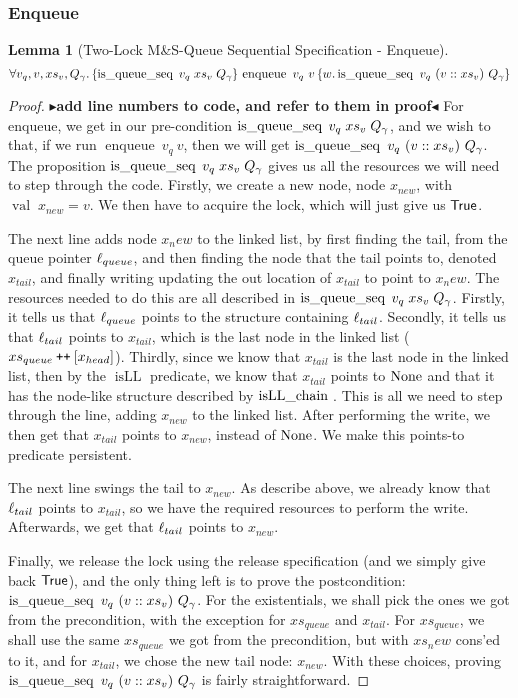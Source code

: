 \documentclass[a4paper, 11pt]{report}
\newtheorem{lemma}[theorem]{Lemma}
\newcommand{\enqueue}{\operatorname{enqueue}}
\newcommand{\isqueueseq}{\operatorname{is\_queue\_seq}}
\newcommand{\isLLchain}[1]{\operatorname{isLL\_chain} \; #1}
\newcommand{\isLL}{\operatorname{isLL}}
\newcommand{\nVal}[1]{\operatorname{val} \; #1}
\newcommand\catenate{\mathbin{\text{\ttfamily\upshape ++}}}
\newcommand{\tlseqspecenq}{\All v_q, v, xs_v, Q_\gname. \hoare{\isqueueseq \; v_q \; xs_v \; Q_\gname}{\enqueue\ v_q\ v}{w . \isqueueseq\ v_q\ (v :: xs_v)\ Q_\gname}}
\newcommand{\todo}[1]{{\color[rgb]{.5,0,0}\textbf{$\blacktriangleright$#1$\blacktriangleleft$}}}
\begin{document}
\subsubsection{Enqueue}
\begin{lemma}[Two-Lock M\&S-Queue Sequential Specification - Enqueue]\label{TLMSQ:spec:seq:enqueue}
  \begin{equation*}
    \tlseqspecenq
  \end{equation*}
\end{lemma}
\begin{proof}
\todo{add line numbers to code, and refer to them in proof}
For enqueue, we get in our pre-condition $\isqueueseq \; v_q \; xs_v \; Q_\gname$, and we wish to that, if we run $\enqueue\ v_q\ v$, then we will get $\isqueueseq\ v_q\ (v :: xs_v)\ Q_\gname$. The proposition $\isqueueseq \; v_q \; xs_v \; Q_\gname$ gives us all the resources we will need to step through the code.
Firstly, we create a new node, node $x_{new}$, with $\nVal{x_{new}} = v$.
We then have to acquire the lock, which will just give us $\textsf{True}$.

The next line adds node $x_new$ to the linked list, by first finding the tail, from the queue pointer $\ell_{queue}$, and then finding the node that the tail points to, denoted $x_{tail}$, and finally writing updating the out location of $x_{tail}$ to point to $x_new$. The resources needed to do this are all described in $\isqueueseq \; v_q \; xs_v \; Q_\gname$. Firstly, it tells us that $\ell_{queue}$ points to the structure containing $\ell_{tail}$. Secondly, it tells us that $\ell_{tail}$ points to $x_{tail}$, which is the last node in the linked list ($xs_{queue} \catenate [x_{head}]$). Thirdly, since we know that $x_{tail}$ is the last node in the linked list, then by the $\isLL$ predicate, we know that $x_{tail}$ points to $\operatorname{None}$ and that it has the node-like structure described by $\isLLchain$. This is all we need to step through the line, adding $x_{new}$ to the linked list. After performing the write, we then get that $x_{tail}$ points to $x_{new}$, instead of $\operatorname{None}$. We make this points-to predicate persistent.

The next line swings the tail to $x_{new}$. As describe above, we already know that $\ell_{tail}$ points to $x_{tail}$, so we have the required resources to perform the write. Afterwards, we get that $\ell_{tail}$ points to $x_{new}$.

Finally, we release the lock using the release specification (and we simply give back $\textsf{True}$), and the only thing left is to prove the postcondition: $\isqueueseq\ v_q\ (v :: xs_v)\ Q_\gname$. For the existentials, we shall pick the ones we got from the precondition, with the exception for $xs_{queue}$ and $x_{tail}$. For $xs_{queue}$, we shall use the same $xs_{queue}$ we got from the precondition, but with $xs_new$ cons'ed to it, and for $x_{tail}$, we chose the new tail node: $x_{new}$. With these choices, proving $\isqueueseq\ v_q\ (v :: xs_v)\ Q_\gname$ is fairly straightforward.
\end{proof}
\end{document}
